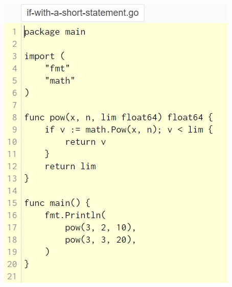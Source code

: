 \documentclass[14pt]{beamer}
\begin{document}
{\begin{frame}
\begin{columns}
\begin{column}{0.5\textwidth}
            \includegraphics[width=0.9\linewidth]{img/ifshort.PNG}
        \end{column}
    \end{columns}
\end{frame}
}
\end{document}

